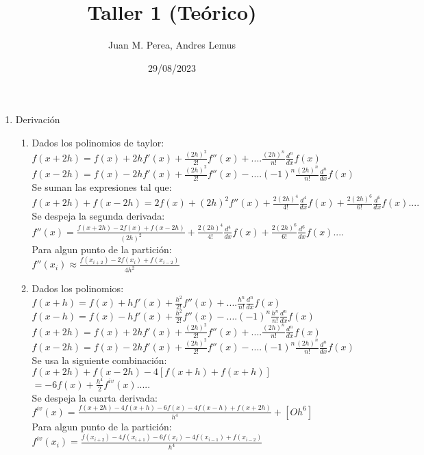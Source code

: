 \documentclass{article}
\title{Taller 1 (Teórico)}
\author{Juan M. Perea, Andres Lemus}
\date{29/08/2023}
\begin{document}
\maketitle

\begin{enumerate}
\renewcommand{\theenumi}{\roman{enumi}}
\item Derivación
	\begin{enumerate}
	\renewcommand{\theenumii}{\arabic{enumii}}
	\item
		Dados los polinomios de taylor:\\
		$f(x+2h)=f(x)+2hf'(x)+\frac{(2h)^2}{2!}f''(x)+....\frac{(2h)^n}{n!}\frac{d^n}{dx}f(x)$\\
		$f(x-2h)=f(x)-2hf'(x)+\frac{(2h)^2}{2!}f''(x)-....(-1)^n\frac{(2h)^n}{n!}\frac{d^n}{dx}f(x)$\\
		Se suman las expresiones tal que:\\
		$f(x+2h)+f(x-2h)=2f(x)+(2h)^2f''(x)+\frac{2(2h)^4}{4!}\frac{d^4}{dx}f(x)+\frac{2(2h)^6}{6!}\frac{d^6}{dx}f(x)....$\\
		Se despeja la segunda derivada:\\
		$f''(x)=\frac{f(x+2h)-2f(x)+f(x-2h)}{(2h)^2}+\frac{2(2h)^4}{4!}\frac{d^4}{dx}f(x)+\frac{2(2h)^6}{6!}\frac{d^6}{dx}f(x)....$\\
		Para algun punto de la partición:\\
		$f''(x_i)\approx\frac{f(x_{i+2})-2f(x_i)+f(x_{i-2})}{4h^2}$
		\addtocounter{enumii}{3}
	\item 
		Dados los polinomios:\\
		$f(x+h)=f(x)+hf'(x)+\frac{h^2}{2!}f''(x)+....\frac{h^n}{n!}\frac{d^n}{dx}f(x)$\\
		$f(x-h)=f(x)-hf'(x)+\frac{h^2}{2!}f''(x)-....(-1)^n\frac{h^n}{n!}\frac{d^n}{dx}f(x)$\\
		$f(x+2h)=f(x)+2hf'(x)+\frac{(2h)^2}{2!}f''(x)+....\frac{(2h)^n}{n!}\frac{d^n}{dx}f(x)$\\
		$f(x-2h)=f(x)-2hf'(x)+\frac{(2h)^2}{2!}f''(x)-....(-1)^n\frac{(2h)^n}{n!}\frac{d^n}{dx}f(x)$\\
		Se usa la siguiente combinación:\\
		$f(x+2h)+f(x-2h)-4[f(x+h)+f(x+h)]$\\
		$=-6f(x)+\frac{h^4}{2}f^{iv}(x).....$\\
		Se despeja la cuarta derivada:\\
		$f^{iv}(x)=\frac{f(x+2h)-4f(x+h)-6f(x)-4f(x-h)+f(x+2h)}{h^4}+[Oh^6]$\\
		Para algun punto de la partición:\\
		$f^{iv}(x_i)=\frac{f(x_{i+2})-4f(x_{i+1})-6f(x_i)-4f(x_{i-1})+f(x_{i-2})}{h^4}$
	\end{enumerate}


\end{enumerate}
\end{document}
